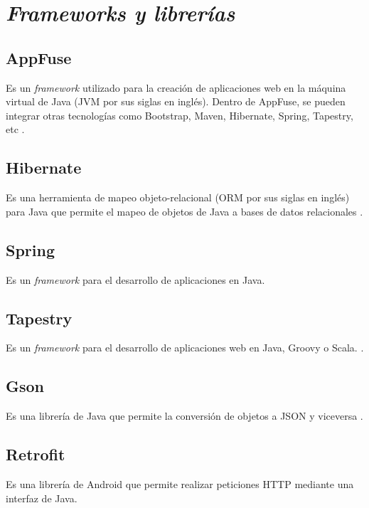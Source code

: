 \section{\textit{Frameworks y librerías}} \label{Frameworks y librerias}

\subsection{AppFuse}
Es un \textit{framework} utilizado para la creación de aplicaciones web en la máquina virtual de Java (JVM por sus siglas en inglés). Dentro de AppFuse, se pueden integrar otras tecnologías como Bootstrap, Maven, Hibernate, Spring, Tapestry, etc \cite{APF1}.

\subsection{Hibernate}
Es una herramienta de mapeo objeto-relacional (ORM por sus siglas en inglés) para Java que permite el mapeo de objetos de Java a bases de datos relacionales \cite{HBR1}.

\subsection{Spring}
Es un \textit{framework} para el desarrollo de aplicaciones en Java.

\subsection{Tapestry}
Es un \textit{framework} para el desarrollo de aplicaciones web en Java, Groovy o Scala.  \cite{ATP1}.

\subsection{Gson}
Es una librería de Java que permite la conversión de objetos a JSON y viceversa \cite{GSN1}
.
\subsection{Retrofit}
Es una librería de Android que permite realizar peticiones HTTP mediante una interfaz de Java\cite{RFT1}.